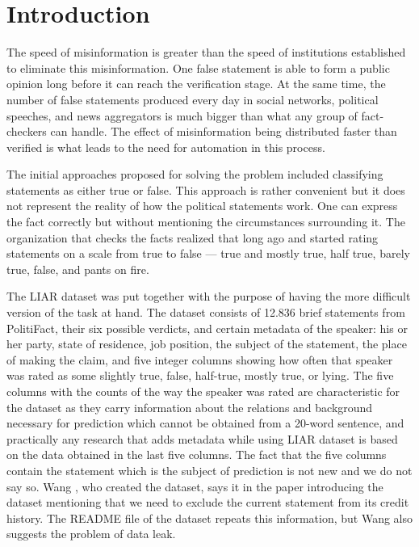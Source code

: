 \documentclass[10pt,twocolumn,twoside,a4paper]{article}
\begin{document}
\section{Introduction}

The speed of misinformation is greater than the speed of institutions established to eliminate this misinformation. One false statement is able to form a public opinion long before it can reach the verification stage. At the same time, the number of false statements produced every day in social networks, political speeches, and news aggregators is much bigger than what any group of fact-checkers can handle. The effect of misinformation being distributed faster than verified is what leads to the need for automation in this process.

The initial approaches proposed for solving the problem included classifying statements as either true or false. This approach is rather convenient but it does not represent the reality of how the political statements work. One can express the fact correctly but without mentioning the circumstances surrounding it. The organization that checks the facts realized that long ago and started rating statements on a scale from true to false --- true and mostly true, half true, barely true, false, and pants on fire.

The LIAR dataset \cite{wang2017liar} was put together with the purpose of having the more difficult version of the task at hand. The dataset consists of 12.836 brief statements from PolitiFact, their six possible verdicts, and certain metadata of the speaker: his or her party, state of residence, job position, the subject of the statement, the place of making the claim, and five integer columns showing how often that speaker was rated as some slightly true, false, half-true, mostly true, or lying. The five columns with the counts of the way the speaker was rated are characteristic for the dataset as they carry information about the relations and background necessary for prediction which cannot be obtained from a 20-word sentence, and practically any research that adds metadata while using LIAR dataset is based on the data obtained in the last five columns. The fact that the five columns contain the statement which is the subject of prediction is not new and we do not say so. Wang \cite{wang2017liar}, who created the dataset, says it in the paper introducing the dataset mentioning that we need to exclude the current statement from its credit history. The README file of the dataset repeats this information, but Wang also suggests the problem of data leak.
\end{document}
